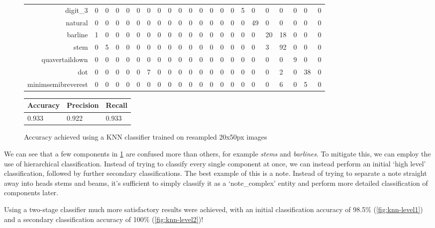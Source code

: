 \begin{figure}[H]
\begin{subtable}[b]{\linewidth}
\begin{tabularx}{\textwidth}{r|XXXXXXXXXXXXXXXXXXXXX}
    digit\_3 & 0 & 0 & 0 & 0 & 0 & 0 & 0 & 0 & 0 & 0 & 0 & 0 & 0 & 0 & 5 & 0 & 0 & 0 & 0 & 0 & 0 \\
    natural & 0 & 0 & 0 & 0 & 0 & 0 & 0 & 0 & 0 & 0 & 0 & 0 & 0 & 0 & 0 & 49 & 0 & 0 & 0 & 0 & 0 \\
    barline & 1 & 0 & 0 & 0 & 0 & 0 & 0 & 0 & 0 & 0 & 0 & 0 & 0 & 0 & 0 & 0 & 20 & 18 & 0 & 0 & 0 \\
    stem & 0 & 5 & 0 & 0 & 0 & 0 & 0 & 0 & 0 & 0 & 0 & 0 & 0 & 0 & 0 & 0 & 3 & 92 & 0 & 0 & 0 \\
    quavertaildown & 0 & 0 & 0 & 0 & 0 & 0 & 0 & 0 & 0 & 0 & 0 & 0 & 0 & 0 & 0 & 0 & 0 & 0 & 9 & 0 & 0 \\
    dot & 0 & 0 & 0 & 0 & 0 & 7 & 0 & 0 & 0 & 0 & 0 & 0 & 0 & 0 & 0 & 0 & 0 & 2 & 0 & 38 & 0 \\
    minimsemibreverest & 0 & 0 & 0 & 0 & 0 & 0 & 0 & 0 & 0 & 0 & 0 & 0 & 0 & 0 & 0 & 0 & 0 & 6 & 0 & 5 & 0 \\
    \end{tabularx}
  \end{subtable}
  \vspace{0.8cm}
  \begin{subtable}[b]{.4\linewidth}
    \begin{tabularx}{\linewidth}{lll}
      \toprule
      Accuracy & Precision & Recall \\
      \midrule
      0.933 & 0.922 & 0.933 \\
      \bottomrule
    \end{tabularx}
  \end{subtable}
  \caption{Accuracy achieved using a KNN classifier trained on resampled 20x50px images}
  \label{table:confusion-matrix-knn-img-all}
\end{figure}

We can see that a few components in \cref{table:confusion-matrix-knn-img-all} are confused more than others, for example \emph{stems} and \emph{barlines}. To mitigate this, we can employ the use of hierarchical classification. Instead of trying to classify every single component at once, we can instead perform an initial `high level' classification, followed by further secondary classifications. The best example of this is a note. Instead of trying to separate a note straight away into heads stems and beams, it's sufficient to simply classify it as a `note\_complex' entity and perform more detailed classification of components later.

Using a two-stage classifier much more satisfactory results were achieved, with an initial classification accuracy of 98.5\% (\cref{fig:knn-level1}) and a secondary classification accuracy of 100\% (\cref{fig:knn-level2})!

